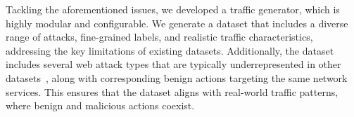 Tackling the aforementioned issues, we developed a traffic generator, which is highly modular and configurable. We generate a dataset that includes a diverse range of attacks, fine-grained labels, and realistic traffic characteristics, addressing the key limitations of existing datasets. Additionally, the dataset includes several web attack types that are typically underrepresented in other datasets~\cite{ring2019survey}, along with corresponding benign actions targeting the same network services. This ensures that the dataset aligns with real-world traffic patterns, where benign and malicious actions coexist.